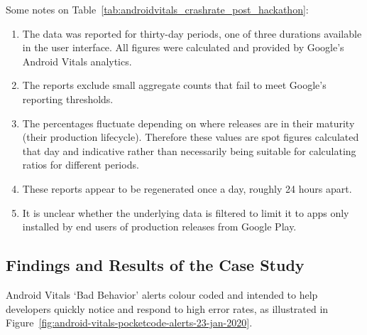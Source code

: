 Some notes on Table~\ref{tab:androidvitals_crashrate_post_hackathon}:
\begin{enumerate}
    \item The data was reported for thirty-day periods, one of three durations available in the user interface. All figures were calculated and provided by Google's Android Vitals analytics.
    \item The reports exclude small aggregate counts that fail to meet Google's reporting thresholds.
    \item The percentages fluctuate depending on where releases are in their maturity (their production lifecycle). Therefore these values are spot figures calculated that day and indicative rather than necessarily being suitable for calculating ratios for different periods. %
    \item These reports appear to be regenerated once a day, roughly 24 hours apart.
    \item It is unclear whether the underlying data is filtered to limit it to apps only installed by end users of production releases from Google Play.
\end{enumerate}


\subsection{Findings and Results of the Case Study}
\label{catrobat-case-study-findings-and-results}

Android Vitals `Bad Behavior' alerts colour coded and intended to help developers quickly notice and respond to high error rates, as illustrated in Figure~\ref{fig:android-vitals-pocketcode-alerts-23-jan-2020}. %

